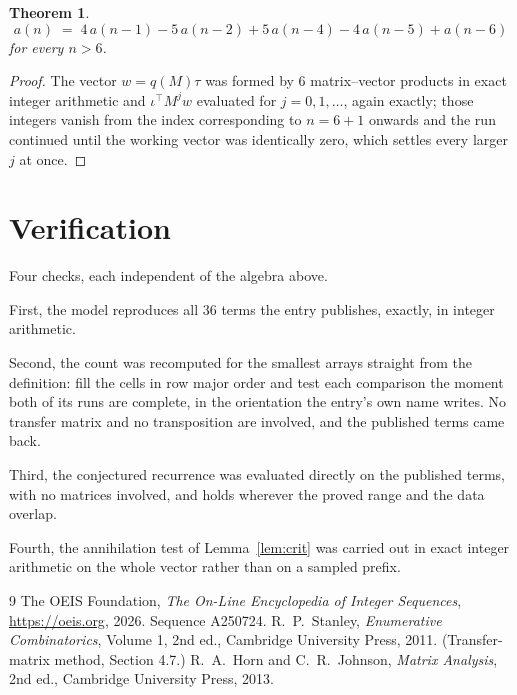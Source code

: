 \documentclass[11pt,a4paper]{article}
\theoremstyle{plain}
\newtheorem{theorem}{Theorem}
\theoremstyle{definition}
\begin{document}
\begin{theorem}
\[
a(n)\;=\;4\,a(n-1) - 5\,a(n-2) + 5\,a(n-4) - 4\,a(n-5) + a(n-6)
\]
for every $n>6$.
\end{theorem}

\begin{proof}
The vector $w=q(M)\tau$ was formed by $6$ matrix--vector products in exact integer
arithmetic and $\iota^{\!\top}M^{j}w$ evaluated for $j=0,1,\dots$, again exactly; those
integers vanish from the index corresponding to $n=6+1$ onwards and the run continued
until the working vector was identically zero, which settles every larger $j$ at once.
\end{proof}

\section{Verification}

Four checks, each independent of the algebra above.

First, the model reproduces all $36$ terms the entry publishes, exactly, in integer
arithmetic.

Second, the count was recomputed for the smallest arrays straight from the definition: fill the
cells in row major order and test each comparison the moment both of its runs are complete,
in the orientation the entry's own name writes. No transfer matrix and no transposition are
involved, and the published terms came back.

Third, the conjectured recurrence was evaluated directly on the published terms, with no
matrices involved, and holds wherever the proved range and the data overlap.

Fourth, the annihilation test of Lemma~\ref{lem:crit} was carried out in exact integer
arithmetic on the whole vector rather than on a sampled prefix.

\begin{thebibliography}{9}
 The OEIS Foundation, \emph{The On-Line Encyclopedia of Integer
Sequences}, \url{https://oeis.org}, 2026. Sequence A250724.
 R.~P.~Stanley, \emph{Enumerative Combinatorics}, Volume 1, 2nd ed.,
Cambridge University Press, 2011. (Transfer-matrix method, Section 4.7.)
 R.~A.~Horn and C.~R.~Johnson, \emph{Matrix Analysis}, 2nd ed., Cambridge
University Press, 2013.
\end{thebibliography}
\end{document}
